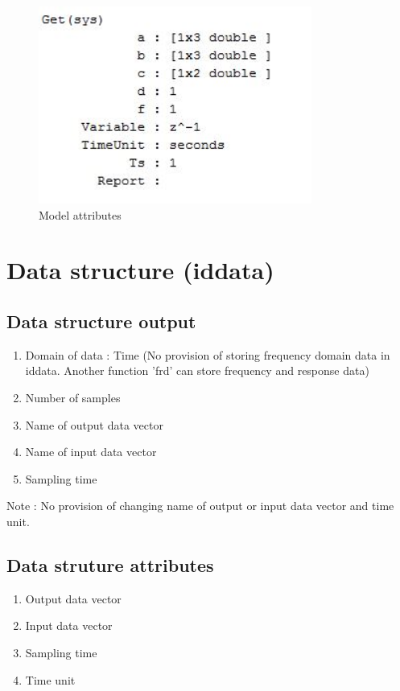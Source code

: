 \documentclass[a4paper,12pt]{report}
\begin{document}
	\begin{figure}[tbp]
		\centering
		\includegraphics[width=0.8\textwidth]{modSci2.JPG}
		\caption{Model attributes}
		\label{}
	\end{figure}
	
	\chapter{Data structure (iddata)}
	
	\section{Data structure output}
	\begin{enumerate}
		
		\item Domain of data : Time (No provision of storing frequency domain data in iddata. Another function 'frd' can store frequency and response data)
		\item Number of samples
		\item Name of output data vector 
		
		\item Name of input data vector
		
		\item Sampling time
		
	\end{enumerate}
	Note : No provision of changing name of output or input data vector and time unit.
	\section{Data struture attributes}
		
	\begin{enumerate}
		\item Output data vector 
		
		\item Input data vector
		
		\item Sampling time
		
		\item Time unit
	\end{enumerate}
\end{document}
